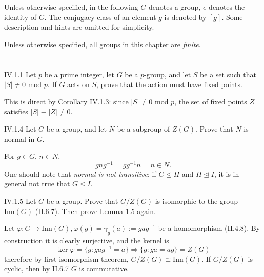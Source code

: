Unless otherwise specified, in the following $G$ denotes a group, $e$ denotes the identity of $G$. The conjugacy class of an element $g$ is denoted by $[g]$. Some description and hints are omitted for simplicity.

Unless otherwise specified, all groups in this chapter are \emph{finite}.

\section{}


\begin{problem}{IV.1.1}
Let $p$ be a prime integer, let $G$ be a $p$-group, and let $S$ be a set such that $|S| \neq 0 \text{ mod } p$. If $G$ acts on $S$, prove that the action must have fixed points.
\end{problem}
\begin{pf}
This is direct by Corollary IV.1.3: since $|S| \neq 0 \text{ mod }p $, the set of fixed points $Z$ satisfies $|S| \equiv |Z| \neq 0$.	
\end{pf}

\begin{problem}{IV.1.4}
Let $G$ be a group, and let $N$ be a subgroup of $Z(G)$. Prove that $N$ is normal in $G$. 	
\end{problem}
\begin{pf}
For $g \in G$, $n \in N$,
\[
gng^{-1} = gg^{-1}n = n \in N.
\]
One should note that \emph{normal is not transitive}: if $G \unlhd H$ and $H \unlhd I$, it is in general not true that $G \unlhd I$.
\end{pf}

\begin{problem}{IV.1.5}
Let $G$ be a group. Prove that $G/Z(G)$ is isomorphic to the group $\text{Inn}(G)$ (II.6.7). Then prove Lemma 1.5 again.
\end{problem}
\begin{pf}
Let $\varphi : G \to \text{Inn}(G), \varphi(g) = \gamma_g(a) := gag^{-1}$ be a homomorphism (II.4.8). By construction it is clearly surjective, and the kernel is
\[
\ker \varphi = \{g: gag^{-1} = a\} \Rightarrow \{g : ga = ag \}	= Z(G)
\]
therefore by first isomorphism theorem, $G/Z(G) \cong \text{Inn}(G)$. If $G/Z(G)$ is cyclic, then by II.6.7 $G$ is commutative.
\end{pf}

